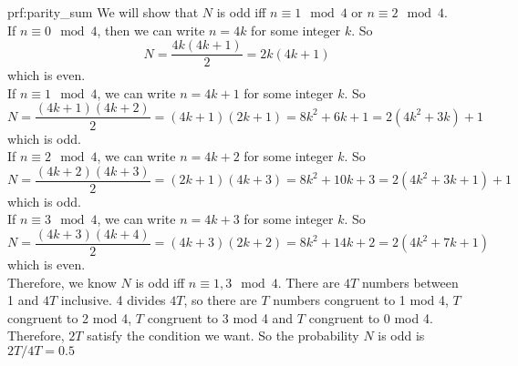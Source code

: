 \begin{prf}{prf:parity_sum} %
We will show that $N$ is odd iff $n \equiv 1 \mod 4$ or $n \equiv 2 \mod 4$. \\

\noindent If $n \equiv 0 \mod 4$, then we can write $n = 4k$ for some integer $k$. So 
    $$N = \frac{4k(4k + 1)}{2} = 2k(4k + 1)$$ 
    which is even. \\
\noindent If $n \equiv 1 \mod 4$, we can write $n = 4k + 1$ for some integer $k$. So 
    $$N = \frac{(4k+1)(4k + 2)}{2} = (4k + 1)(2k + 1) = 8k^2 + 6k + 1 = 2(4k^2 + 3k) + 1$$ 
    which is odd. \\
\noindent If $n \equiv 2 \mod 4$, we can write $n = 4k + 2$ for some integer $k$. So 
    $$N = \frac{(4k+2)(4k + 3)}{2} = (2k + 1)(4k + 3) = 8k^2 + 10k + 3 = 2(4k^2 + 3k + 1) + 1$$ 
    which is odd. \\
  \noindent  If $n \equiv 3 \mod 4$, we can write $n = 4k + 3$ for some integer $k$. So 
    $$N = \frac{(4k+3)(4k + 4)}{2} = (4k + 3)(2k + 2) = 8k^2 + 14k + 2 = 2(4k^2 + 7k + 1)$$ 
    which is even. \\
    
Therefore, we know $N$ is odd iff $n \equiv 1,3 \mod 4$. There are $4T$ numbers between 1 and $4T$ inclusive. 4 divides $4T$, so there are $T$ numbers congruent to 1 mod 4, $T$ congruent to 2 mod 4, $T$ congruent to 3 mod 4 and $T$ congruent to 0 mod 4. Therefore, $2T$ satisfy the condition we want. So the probability $N$ is odd is $2T/4T = 0.5$
\end{prf}